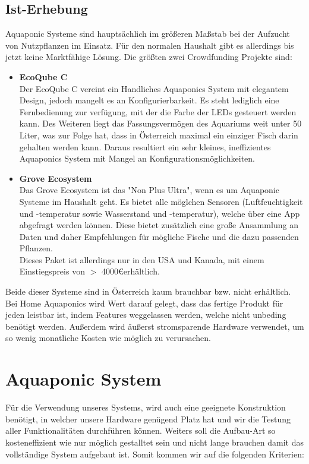 \documentclass[11pt]{article}
\begin{document}
\subsection{Ist-Erhebung}
Aquaponic Systeme sind haupts\"achlich im gr\"o{\ss}eren Ma{\ss}stab bei der Aufzucht von Nutzpflanzen im Einsatz. F\"ur den normalen Haushalt gibt es allerdings bis jetzt keine Marktf\"ahige L\"osung. Die gr\"o{\ss}ten zwei Crowdfunding Projekte sind:
\begin{itemize}
	\item \textbf{EcoQube C}\\
		Der EcoQube C vereint ein Handliches Aquaponics System mit elegantem Design, jedoch mangelt es an Konfigurierbarkeit. Es steht lediglich eine Fernbedienung zur verf\"ugung, mit der die Farbe der LEDs gesteuert werden kann. Des Weiteren liegt das Fassungsverm\"ogen des Aquariums weit unter 50 Liter, was zur Folge hat, dass in \"Osterreich maximal ein einziger Fisch darin gehalten werden kann. Daraus resultiert ein sehr kleines, ineffizientes Aquaponics System mit Mangel an Konfigurationsm\"oglichkeiten. \\
	\item \textbf{Grove Ecosystem}\\
	Das Grove Ecosystem ist das "Non Plus Ultra", wenn es um Aquaponic Systeme im Haushalt geht. Es bietet alle m\"oglchen Sensoren (Luftfeuchtigkeit und -temperatur sowie Wasserstand und -temperatur), welche \"uber eine App abgefragt werden k\"onnen. Diese bietet zus\"atzlich eine gro{\ss}e Ansammlung an Daten und daher Empfehlungen f\"ur m\"ogliche Fische und die dazu passenden Pflanzen. \\
	Dieses Paket ist allerdings nur in den USA und Kanada, mit einem Einstiegspreis von $>$ 4000\euro\hspace{0.5em}erh\"altlich.
\end{itemize}
Beide dieser Systeme sind in \"Osterreich kaum brauchbar bzw. nicht erh\"altlich. Bei Home Aquaponics wird Wert darauf gelegt, dass das fertige Produkt f\"ur jeden leistbar ist, indem Features weggelassen werden, welche nicht unbeding ben\"otigt werden. Au{\ss}erdem wird \"au{\ss}erst stromsparende Hardware verwendet, um so wenig monatliche Kosten wie m\"oglich zu verursachen.
\newpage
\section{Aquaponic System}
F\"ur die Verwendung unseres Systems, wird auch eine geeignete Konstruktion
ben\"otigt, in welcher unsere Hardware gen\"ugend Platz hat und wir die Testung aller Funktionalit\"aten durchf\"uhren k\"onnen. Weiters soll die Aufbau-Art so kosteneffizient wie nur m\"oglich gestalltet sein und nicht lange brauchen damit das vollst\"andige System aufgebaut ist.
Somit kommen wir auf die folgenden Kriterien:
\end{document}
